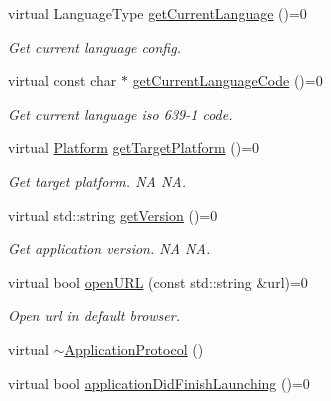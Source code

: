 \begin{DoxyCompactItemize}
\item 
virtual Language\+Type \hyperlink{classApplicationProtocol_a44034ed02f9dd0fc59264f74f9ef9b17}{get\+Current\+Language} ()=0
\begin{DoxyCompactList}\small\item\em Get current language config. \end{DoxyCompactList}\item 
virtual const char $\ast$ \hyperlink{classApplicationProtocol_a4cb7a696dd51fee3ebb3075f0cca1455}{get\+Current\+Language\+Code} ()=0
\begin{DoxyCompactList}\small\item\em Get current language iso 639-\/1 code. \end{DoxyCompactList}\item 
\mbox{\label{classApplicationProtocol_a20931b60a1fc13a6dfc2ef322ecb5ce7}} 
virtual \hyperlink{classApplicationProtocol_aff3819b9b879107dc9c207d0e7ae36d1}{Platform} \hyperlink{classApplicationProtocol_a20931b60a1fc13a6dfc2ef322ecb5ce7}{get\+Target\+Platform} ()=0
\begin{DoxyCompactList}\small\item\em Get target platform.  NA  NA. \end{DoxyCompactList}\item 
\mbox{\label{classApplicationProtocol_aad2851a7176c571a79cf068d72543012}} 
virtual std\+::string \hyperlink{classApplicationProtocol_aad2851a7176c571a79cf068d72543012}{get\+Version} ()=0
\begin{DoxyCompactList}\small\item\em Get application version.  NA  NA. \end{DoxyCompactList}\item 
virtual bool \hyperlink{classApplicationProtocol_a152a977b301a90253ec5a6533b2e8e04}{open\+U\+RL} (const std\+::string \&url)=0
\begin{DoxyCompactList}\small\item\em Open url in default browser. \end{DoxyCompactList}\item 
virtual \hyperlink{classApplicationProtocol_aad06d82865e90137c243dd987d7ab1c4}{$\sim$\+Application\+Protocol} ()
\item 
virtual bool \hyperlink{classApplicationProtocol_a8f44759d0b686ababcbb15d106b08ca4}{application\+Did\+Finish\+Launching} ()=0

\end{DoxyCompactItemize}
